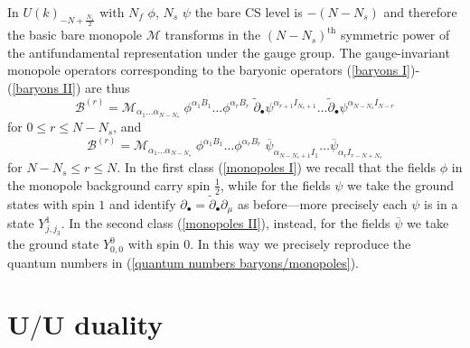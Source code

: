 \documentclass[a4paper, 12pt]{article}
\newcommand{\matht}[1]{\ensuremath{\boldsymbol{#1}}}
\numberwithin{equation}{section}
\newcommand{\be}{\begin{equation}} \newcommand{\ee}{\end{equation}}
\newcommand{\cB}{\mathcal{B}}
\newcommand{\cM}{\mathcal{M}}
\begin{document}
In $U(k)_{-N+\frac{N_s}2}$ with $N_f$ $\phi$, $N_s$ $\psi$ the bare CS level is $-(N-N_s)$ and therefore the basic bare monopole $\cM$ transforms in the $(N-N_s)^\text{th}$ symmetric power of the antifundamental representation under the gauge group. The gauge-invariant monopole operators corresponding to the baryonic operators (\ref{baryons I})-(\ref{baryons II}) are thus
\be
\label{monopoles I}
\cB^{(r)} = \cM_{\alpha_1 \ldots \alpha_{N-N_s}} \; \phi^{\alpha_1 B_1} \dots \phi^{\alpha_r B_r} \; \tilde\partial_\bullet \psi^{\alpha_{r+1} I_{N_s+1}} \dots \tilde\partial_\bullet \psi^{\alpha_{N-N_s} I_{N-r}}
\ee
for $0 \leq r \leq N-N_s$, and
\be
\label{monopoles II}
\cB^{(r)} = \cM_{\alpha_1 \ldots \alpha_{N-N_s}} \; \phi^{\alpha_1 B_1} \dots \phi^{\alpha_r B_r} \; \overline\psi_{\alpha_{N-N_s+1} I_1} \ldots \overline\psi_{\alpha_r I_{r-N+N_s}}
\ee
for $N-N_s \leq r \leq N$. In the first class (\ref{monopoles I}) we recall that the fields $\phi$ in the monopole background carry spin $\frac12$, while for the fields $\psi$ we take the ground states with spin $1$ and identify $\partial_\bullet = \tilde\partial_\bullet \partial_\mu$ as before---more precisely each $\psi$ is in a state $Y^1_{j,j_3}$. In the second class (\ref{monopoles II}), instead, for the fields $\overline\psi$ we take the ground state $Y^0_{0,0}$ with spin $0$. In this way we precisely reproduce the quantum numbers in (\ref{quantum numbers baryons/monopoles}).


















\section{\matht{U/U} duality}
\label{sec: U/U duality}
\end{document}
